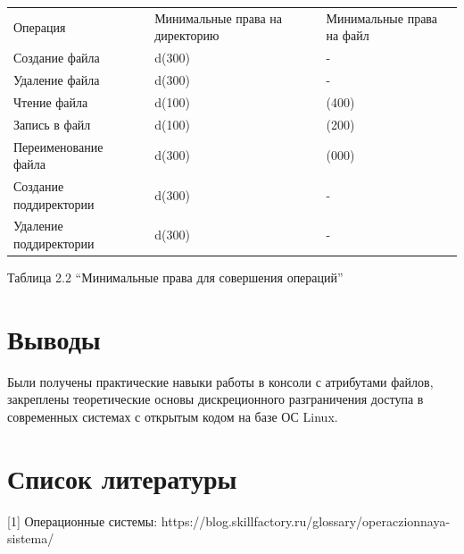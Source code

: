 \documentclass[
  12pt,
  a4paper,
  DIV=11,
  numbers=noendperiod]{scrreprt}
\begin{document}
\begin{longtable}[]{@{}
  >{\raggedright\arraybackslash}p{}
  >{\raggedright\arraybackslash}p{}
  >{\raggedright\arraybackslash}p{}
  >{\raggedright\arraybackslash}p{}
  >{\raggedright\arraybackslash}p{}@{}}
\toprule\noalign{}
\endhead
\bottomrule\noalign{}
\endlastfoot
Операция & & Минимальные права на директорию & & Минимальные права на
файл \\
Создание файла & & d(300) & & - \\
Удаление файла & & d(300) & & - \\
Чтение файла & & d(100) & & (400) \\
Запись в файл & & d(100) & & (200) \\
Переименование файла & & d(300) & & (000) \\
Создание поддиректории & & d(300) & & - \\
Удаление поддиректории & & d(300) & & - \\
\end{longtable}

Таблица 2.2 \enquote{Минимальные права для совершения операций}

\chapter{Выводы}\label{ux432ux44bux432ux43eux434ux44b}

Были получены практические навыки работы в консоли с атрибутами файлов,
закреплены теоретические основы дискреционного разграничения доступа в
современных системах с открытым кодом на базе ОС Linux.

\chapter{Список
литературы}\label{ux441ux43fux438ux441ux43eux43a-ux43bux438ux442ux435ux440ux430ux442ux443ux440ux44b}

{[}1{]} Операционные системы:
https://blog.skillfactory.ru/glossary/operaczionnaya-sistema/


\printbibliography
\end{document}
